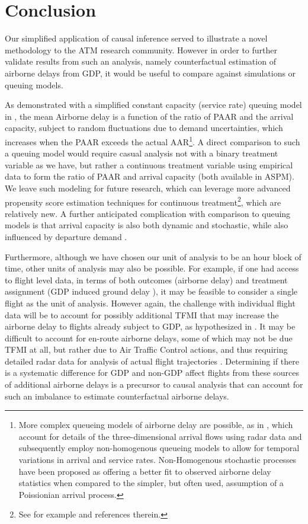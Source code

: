\documentclass[conference]{IEEEtran}
\begin{document}
% 

\section{Conclusion}
Our simplified application of causal inference served to illustrate a novel methodology to the ATM research community.  However in order to further validate results from such an analysis, namely counterfactual estimation of airborne delays from GDP, it would be useful to compare against simulations or queuing models.    

As demonstrated with a simplified constant capacity (service rate) queuing model in \cite{ball2001analysis}, the mean Airborne delay is a function of the ratio of PAAR and the arrival capacity,  subject to random fluctuations due to demand uncertainties, which increases when the PAAR exceeds the actual AAR\footnote{More complex queueing models of airborne delay are possible, as in \cite{gwiggner2014data}, which account for details of the three-dimensional arrival flows using radar data and subsequently employ non-homogenous queueing models to allow for temporal variations in arrival and service rates.  Non-Homogenous stochastic processes have been proposed as offering a better fit to observed airborne delay statistics \cite{caccavale2014model} when compared to the simpler, but often used, assumption of a Poissionian arrival process.}.  A direct comparison to such a queuing model would require casual analysis not with a binary treatment variable as we have, but rather a continuous treatment variable using empirical data to form the ratio of PAAR and arrival capacity (both available in ASPM).  We leave such modeling for future research, which can leverage more advanced propensity score estimation techniques for continuous treatment\footnote{See for example \cite{kreif2015evaluation} and references therein.}, which are relatively new.   A further anticipated complication with comparison to queuing models is that arrival capacity is also both dynamic and stochastic, while also influenced by departure demand \cite{jacquillat2015endogenous}. 

Furthermore, although we have chosen our unit of analysis to be an hour block of time, other units of analysis may also be possible.  For example, if one had access to flight level data, in terms of both outcomes (airborne delay) and treatment assignment (GDP induced ground delay ), it may be feasible to consider a single flight as the unit of analysis.  However again, the challenge with individual flight data will be to account for possibly additional TFMI that may increase the airborne delay to flights already subject to GDP, as hypothesized in \cite{bilimoria2016analysis}.  It may be difficult to account for en-route airborne delays, some of which may not be due TFMI at all, but rather due to Air Traffic Control actions, and thus requiring detailed radar data for analysis of actual flight trajectories \cite{belkoura2016generation}.  Determining if there is a systematic difference for GDP and non-GDP affect flights from these sources of additional airborne delays is a precursor to causal analysis that can account for such an imbalance to estimate counterfactual airborne delays.  
\end{document}
